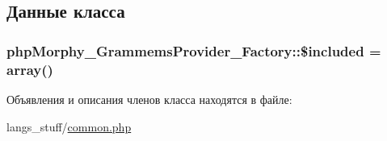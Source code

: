 \subsection{Данные класса}
\hypertarget{classphpMorphy__GrammemsProvider__Factory_ab55a562475cb4f07ec264940178a8870}{
\subsubsection[{\$included}]{\setlength{\rightskip}{0pt plus 5cm}phpMorphy\_\-GrammemsProvider\_\-Factory::\$included = array()}}
\label{classphpMorphy__GrammemsProvider__Factory_ab55a562475cb4f07ec264940178a8870}


Объявления и описания членов класса находятся в файле:\begin{DoxyCompactItemize}
\item 
langs\_\-stuff/\hyperlink{langs__stuff_2common_8php}{common.php}\end{DoxyCompactItemize}
